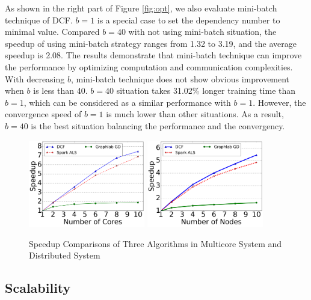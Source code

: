 \documentclass{llncs}
\begin{document}
As shown in the right part of Figure \ref{fig:opt}, we also evaluate mini-batch technique of DCF. $b = 1$ is a special case to set the dependency number to minimal value. Compared $b=40$ with not using mini-batch situation, the speedup of using mini-batch strategy ranges from 1.32 to 3.19, and the average speedup is 2.08. The results demonstrate that mini-batch technique can improve the performance by optimizing computation and communication complexities. With decreasing $b$, mini-batch technique does not show obvious improvement when $b$ is less than 40. $b=40$ situation takes 31.02\% longer training time than $b=1$, which can be considered as a similar performance with $b=1$. However, the convergence speed of $b=1$ is much lower than other situations. As a result, $b=40$ is the best situation balancing the performance and the convergency.

\begin{figure}[!t]
\centering
\includegraphics[width=2in]{pics/core.pdf}
\includegraphics[width=2in]{pics/node.pdf}
\vspace{-10pt}
\caption{Speedup Comparisons of Three Algorithms in Multicore System and Distributed System}
\vspace{-15pt}
\label{fig:core}
\end{figure}


\vspace{-15pt}
\subsection{Scalability}
\label{sub:sca}
\end{document}
